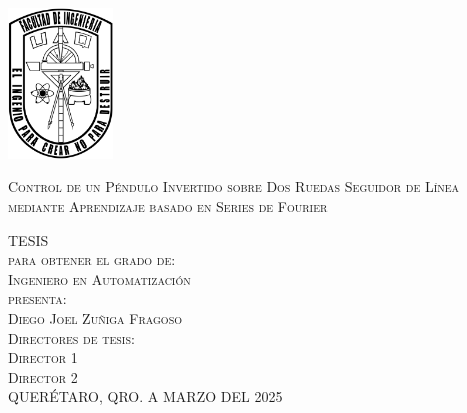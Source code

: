 \documentclass[11pt, twoside]{book}     %
\newcommand{\fullname}      {Control de un Péndulo Invertido sobre Dos Ruedas Seguidor de Línea mediante Aprendizaje basado en Series de Fourier}
\begin{document}
\begin{titlepage}
        \begin{minipage}[c][0.81\textheight][t]{0.25\textwidth}
            \vspace*{5mm}
            \begin{center}
                \hskip2.0mm
                \vrule width1pt height13cm 
                \vspace{5mm}
                \hskip2pt
                \vrule width2.5pt height13cm
                \hskip2mm
                \vrule width1pt height13cm \\
                \vspace{5mm}
                \includegraphics[height=4.0cm]{Recursos/Imagenes/Portada/Escudo_Ingenieria_UAQ.png}
            \end{center}
        \end{minipage}
        \begin{minipage}[c][0.81\textheight][t]{0.75\textwidth}
            \begin{center}
                \vspace{1cm}

                {\large\scshape \fullname}\\[.2in]

                \vspace{1.5cm}            

                \textsc{\LARGE T\hspace{1.5cm}E\hspace{1.5cm}S\hspace{1.5cm}I\hspace{1.5cm}S}\\[1cm]
                \textsc{\large para obtener el grado de:}\\[0.5cm]
                \textsc{\large Ingeniero en Automatización}\\[1.5cm]
                \textsc{\large presenta:}\\[0.5cm]
                \textsc{\large {Diego Joel Zuñiga Fragoso}}\\[1.5cm]          

                {\large\scshape Directores de tesis:\\[0.3cm] {Director 1 \\[0.2cm]
        
                Director 2}}\\[1.5cm]

                \large{QUERÉTARO, QRO.} {A MARZO DEL} {2025}
            \end{center}
        \end{minipage}
    \end{titlepage}
    \newpage
    
\end{document}
